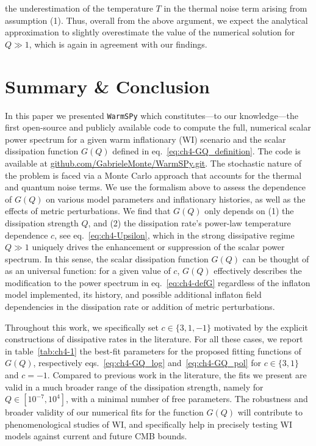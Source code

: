 the underestimation  of the temperature $T$ in the thermal noise term arising from assumption (1). Thus, overall from the above argument, we expect the analytical approximation to slightly overestimate the value of the numerical solution for $Q\gg1$, which is again in agreement with our findings.


\section{Summary \& Conclusion}

In this paper we presented \texttt{WarmSPy} which constitutes—to our knowledge—the first open-source and publicly available code to compute the full, numerical scalar power spectrum for a given warm inflationary (WI) scenario and the scalar dissipation function $G(Q)$ defined in eq.~\eqref{eq:ch4-GQ_definition}.
The code is available at \href{https://github.com/GabrieleMonte/WarmSPy.git}{github.com/GabrieleMonte/WarmSPy.git}. The stochastic nature of the problem is faced via a Monte Carlo approach that accounts for the thermal and quantum noise terms. We use the formalism above to assess the dependence of $G(Q)$ on various model parameters and inflationary histories, as well as the effects of metric perturbations. We find that $G(Q)$ only depends on (1) the dissipation strength $Q$, and (2) the dissipation rate's power-law temperature dependence $c$, see eq.~\eqref{eq:ch4-Upsilon}, which in the strong dissipative regime $Q\gg 1$ uniquely drives the enhancement or suppression of the scalar power spectrum. In this sense, the scalar dissipation function $G(Q)$ can be thought of as an universal function: for a given value of $c$, $G(Q)$ effectively describes the modification to the power spectrum in eq.~\eqref{eq:ch4-defG} regardless of the inflaton model implemented, its history, and possible additional inflaton field dependencies in the dissipation rate or addition of metric perturbations.

Throughout this work, we specifically set $c\in\{3,1,-1\}$ motivated by the explicit constructions of dissipative rates in the literature. For all these cases, we report in table~\ref{tab:ch4-1} the best-fit parameters for the proposed fitting functions of $G(Q)$, respectively eqs.~\eqref{eq:ch4-GQ_log} and~\eqref{eq:ch4-GQ_pol} for $c\in\{3,1\}$ and $c=-1$. Compared to previous work in the literature, the fits we present are valid in a much broader range of the dissipation strength, namely for $Q\in[10^{-7},10^{4}]$, with a minimal number of free parameters. The robustness and broader validity of our numerical fits for the function $G(Q)$ will contribute to phenomenological studies of WI, and specifically help in precisely testing WI models against current and future CMB bounds.

